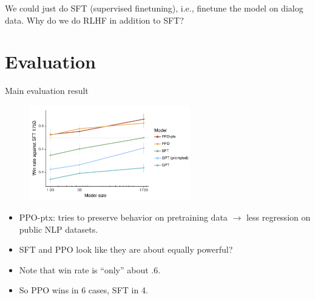 \begin{vbframe}{}

		\ques
We could just do SFT (supervised finetuning), i.e.,
finetune the model
		on dialog data. Why do we do RLHF in
                addition to SFT?

\end{vbframe}





\section{Evaluation}





\begin{vbframe}{Main evaluation result}

\vfill

\begin{figure}
\centering
\includegraphics[width = 7cm]{figure/mainresult.png}
\end{figure}

\begin{itemize}
	\item PPO-ptx: tries to preserve behavior on
	pretraining data $\rightarrow$ less regression on
	public NLP datasets.
	\item SFT and PPO look like they are about equally
	powerful?
        \item Note that win rate is ``only'' about .6.
        \item So PPO wins in 6 cases, SFT in 4.
\end{itemize}

\vfill

\end{vbframe}

